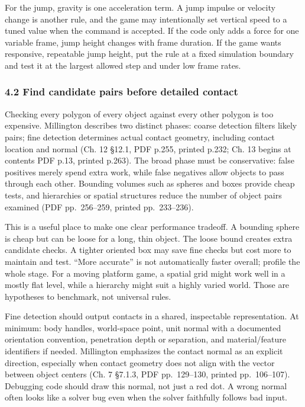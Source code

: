 For the jump, gravity is one acceleration term. A jump impulse or velocity change is another rule, and the game may intentionally set vertical speed to a tuned value when the command is accepted. If the code only adds a force for one variable frame, jump height changes with frame duration. If the game wants responsive, repeatable jump height, put the rule at a fixed simulation boundary and test it at the largest allowed step and under low frame rates.

\subsubsection{4.2 Find candidate pairs before detailed contact}\label{06-engine-ii-ch033-find-candidate-pairs-before-detailed-contact}

Checking every polygon of every object against every other polygon is too expensive. Millington describes two distinct phases: coarse detection filters likely pairs; fine detection determines actual contact geometry, including contact location and normal (Ch. 12 §12.1, PDF p.255, printed p.232; Ch. 13 begins at contents PDF p.13, printed p.263). The broad phase must be conservative: false positives merely spend extra work, while false negatives allow objects to pass through each other. Bounding volumes such as spheres and boxes provide cheap tests, and hierarchies or spatial structures reduce the number of object pairs examined (PDF pp.~256--259, printed pp.~233--236).

This is a useful place to make one clear performance tradeoff. A bounding sphere is cheap but can be loose for a long, thin object. The loose bound creates extra candidate checks. A tighter oriented box may save fine checks but cost more to maintain and test. ``More accurate'' is not automatically faster overall; profile the whole stage. For a moving platform game, a spatial grid might work well in a mostly flat level, while a hierarchy might suit a highly varied world. Those are hypotheses to benchmark, not universal rules.

Fine detection should output contacts in a shared, inspectable representation. At minimum: body handles, world-space point, unit normal with a documented orientation convention, penetration depth or separation, and material/feature identifiers if needed. Millington emphasizes the contact normal as an explicit direction, especially when contact geometry does not align with the vector between object centers (Ch. 7 §7.1.3, PDF pp.~129--130, printed pp.~106--107). Debugging code should draw this normal, not just a red dot. A wrong normal often looks like a solver bug even when the solver faithfully follows bad input.

